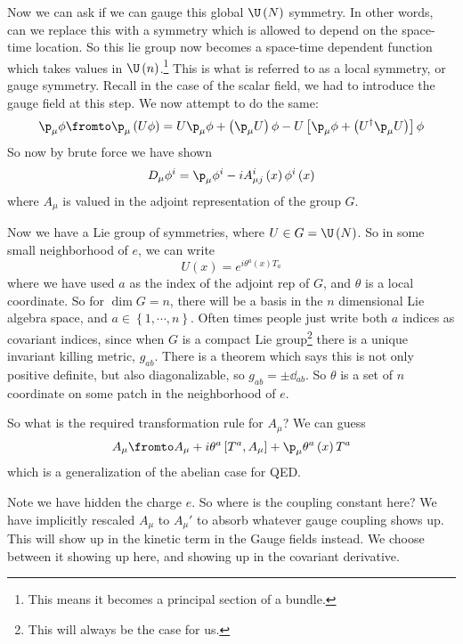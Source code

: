 \documentclass{booc}
\begin{document}
Now we can ask if we can gauge this global $\U\left( N \right)$ symmetry.
In other words, can we replace this with a symmetry
which is allowed to depend on the space-time location.
So this lie group now becomes a space-time dependent 
function which takes values in $\U\left( n \right)$.\footnote{
This means it becomes a principal section of a bundle.}
This is what is referred to as a local symmetry, or gauge symmetry. 
Recall in the case of the scalar field,
we had to introduce the gauge field at this step.
We now attempt to do the same:
\begin{equation}
\p_\mu \phi  \fromto
\p_\mu\left( U\phi \right) = 
U\p_\mu \phi + \left( \p_\mu U \right) \phi - 
U\left[ \p_\mu \phi + \left( U^\dag \p_\mu U\right) \right]\phi
\end{equation}
So now by brute force we have shown
\begin{equation}
D_\mu \phi^i = 
\p_\mu \phi^i - i A^{i}_{\mu j}\left( x \right)
\phi^i\left( x \right)
\end{equation}
where $A_\mu$ is valued in the adjoint representation
of the group $G$. 

Now we have a Lie group of symmetries, where $U\in G = \U\left( N \right)$. 
So in some small neighborhood of $e$, we can write
\begin{equation}
U\left( x \right) = e^{i\theta^a\left( x \right) T_a}
\end{equation}
where we have used $a$ as the index of the adjoint rep
of $G$, and $\theta$ is a local coordinate. So for $\dim G = n$, 
there will be a basis in the $n$ dimensional 
Lie algebra space, and $a \in \left\{ 1 , \cdots , n \right\}$. 
Often times people just write both $a$ indices as covariant indices, since
when $G$ is a compact Lie group\footnote{
This will always be the case for us.}
there is a unique invariant killing metric,
$g_{ab}$.
There is a theorem which says this is not only positive definite, 
but also diagonalizable, so $g_{ab} = \pm \dd_{ab}$.
So $\theta$ is a set of $n$ coordinate on some patch in the neighborhood of $e$.

So what is the required
transformation rule for $A_\mu$?
We can guess
\begin{equation}
A_\mu \fromto 
A_\mu + i\theta^a \left[ T^a , A_\mu \right] + 
\p_\mu \theta^a\left( x \right) T^a
\end{equation}
which is a generalization of the abelian case for QED.

\begin{wrn}
Note we have hidden the charge $e$.
So where is the coupling constant here?
We have implicitly 
rescaled $A_\mu$ to $A_\mu'$ to absorb whatever gauge coupling shows up.
This will show up in the kinetic term in the Gauge fields instead.
We choose between it showing up here, and showing up in the covariant derivative.
\end{wrn}
\end{document}
